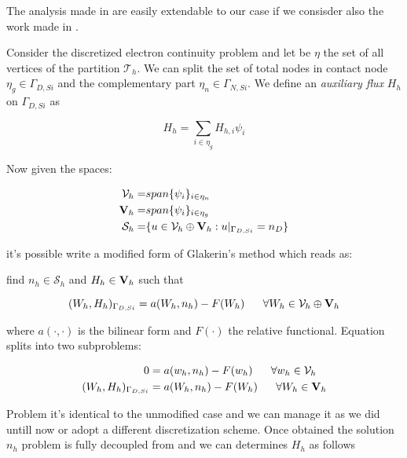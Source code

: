 The analysis made in \cite{ContactCurrentRM} are easily extendable to  our case if we consisder also the work made in \cite{GalerkMethConsHughes}. 



Consider the discretized electron continuity problem  and let be $\eta$  the set of all vertices of the partition $\mathcal{T}_h$.  We can split the set of total nodes in contact node $\eta_g \in \Gamma_{D,Si}$ and the complementary part $\eta_n \in \Gamma_{N,Si}$. We define an \textit{auxiliary flux} $H_h$ on $\Gamma_{D,Si}$ as

\begin{equation}
H_h = \sum_{i\in\eta_g} H_{h,i} \psi_i 
\end{equation}


Now given the spaces:

\begin{align*}
\mathcal{V}_h = & span\{\psi_i\}_{i \in \eta_n} \\
\mathbf{V}_h = & span\{\psi_i\}_{i \in \eta_g}  \\
\mathcal{S}_h = & \{u \in \mathcal{V}_h \oplus \mathbf{V}_h: u|_{\Gamma_{D,Si}} = n_D \}
\end{align*}

it's possible write a modified form of Glakerin's method which reads as: 

find $n_h  \in \mathcal{S}_h$ and $H_h \in \mathbf{V}_h$ such that

\begin{equation}
\label{eq: modified galerkin}
(W_h,H_h)_{\Gamma_{D,Si}} = a(W_h,n_h)-F(W_h) \psp{10} \forall W_h \in \mathcal{V}_h \oplus \vect{V}_h
\end{equation}

where $a(\cdot,\cdot)$ is the bilinear form  and $F(\cdot)$ the relative functional.
Equation  splits into two subproblems:

\begin{align}
0  & = a(w_h,n_h)-F(w_h) \psp{10} \forall w_h \in \mathcal{V}_h \label{eq: usual problem}\\
(W_h,H_h)_{\Gamma_{D,Si}} & = a(W_h,n_h)-F(W_h) \psp{10} \forall W_h \in \vect{V}_h \label{eq: flux problem}
\end{align}

Problem  it's identical to the unmodified case and we can manage it as we did untill now or adopt a different discretization scheme. Once obtained the solution $n_h$ problem  is fully decoupled from  and we can determines $H_h$ as follows

